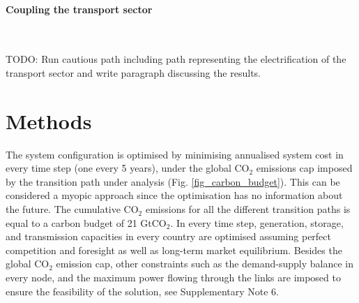 \documentclass[5p]{elsarticle} %
\begin{document}
\paragraph{\textbf{Coupling the transport sector}} \

\textcolor[rgb]{1,0,0}{TODO: Run cautious path including path representing the electrification of the transport sector and write paragraph discussing the results.}



\section{Methods}

The system configuration is optimised by minimising annualised system cost in every time step (one every 5 years), under the global CO$_2$ emissions cap imposed by the transition path under analysis (Fig. \ref{fig_carbon_budget}). This can be considered a myopic approach since the optimisation has no information about the future. The cumulative CO$_2$ emissions for all the different transition paths is equal to a carbon budget of 21 GtCO$_2$. In every time step, generation, storage, and transmission capacities in every country are optimised assuming perfect competition and foresight as well as long-term market equilibrium. Besides the global CO$_2$ emission cap, other constraints such as the demand-supply balance in every node, and the maximum power flowing through the links are imposed to ensure the feasibility of the solution, see Supplementary Note 6. \
\end{document}
